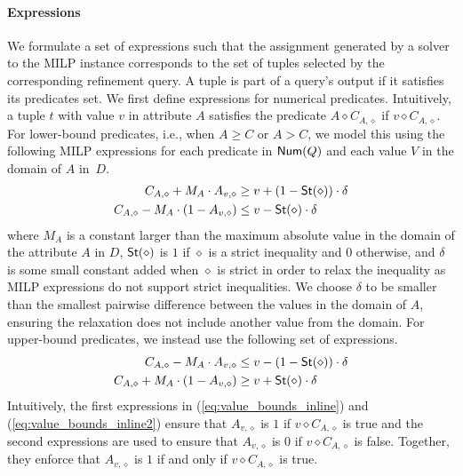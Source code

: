\paragraph*{\textbf{Expressions}}  We formulate a set of expressions such that the assignment generated by a solver to the MILP instance corresponds to the set of tuples selected by the corresponding refinement query. A tuple is part of a query's output if it satisfies its predicates set. We first define expressions for numerical predicates. Intuitively, a tuple $t$ with value $v$ in attribute $A$ satisfies the predicate $A \diamond C_{A, \diamond}$ if $v \diamond C_{A, \diamond}$. For lower-bound predicates, i.e., when $A \geq C$ or $A > C$, we model this using the following MILP expressions for each predicate in $\textsf{Num}(Q)$ and each value $V$ in the domain of $A$ in~$D$.%
\begin{align}
\begin{split}
C_{A, \diamond} + M_A \cdot A_{v, \diamond} &\geq v + (1 - {\sf St}(\diamond)) \cdot \delta \label{eq:value_bounds_inline}\\
C_{A, \diamond} - M_A \cdot (1 - A_{v, \diamond}) &\leq v - {\sf St}(\diamond) \cdot \delta
\end{split}
\end{align} 
where $M_A$ is a constant larger than the maximum absolute value in the domain of the attribute $A$ in $D$, ${\sf St}(\diamond)$ is $1$ if $\diamond$ is a strict inequality and $0$ otherwise, and $\delta$ is some small constant added when $\diamond$ is strict in order to relax the inequality as MILP expressions do not support strict inequalities. We choose $\delta$ to be smaller than the smallest pairwise difference between the values in the domain of $A$, ensuring the relaxation does not include another value from the domain. For upper-bound predicates, we instead use the following set of expressions.
\begin{align}
\begin{split}
C_{A, \diamond} - M_A \cdot A_{v, \diamond} &\leq v - (1 - {\sf St}(\diamond)) \cdot \delta \label{eq:value_bounds_inline2}\\
C_{A, \diamond} + M_A \cdot (1 - A_{v, \diamond}) &\geq v + {\sf St}(\diamond) \cdot \delta
\end{split}
\end{align}
 Intuitively, the first expressions in (\ref{eq:value_bounds_inline}) and (\ref{eq:value_bounds_inline2}) ensure that $A_{v, \diamond}$ is $1$ if $v \diamond C_{A, \diamond}$ is true and the second expressions are used to ensure that $A_{v, \diamond}$ is 0 if $v \diamond C_{A, \diamond}$ is false. Together, they enforce that $A_{v, \diamond}$ is $1$ if and only if $v \diamond C_{A, \diamond}$ is true.


